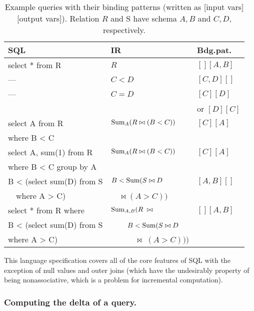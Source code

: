 \begin{table}
\begin{center}
\begin{scriptsize}
\begin{tabular}{|l|l|l|}
\hline
SQL & IR & Bdg.pat. \\
\hline
select * from R   & $R$ & $[][A,B]$ \\
--- & $C < D$ & $[C,D][]$ \\
--- & $C = D$ & $[C][D]$ \\
&& or $[D][C]$
\\[1ex]
select A from R   & $\mbox{Sum}_A(R \bowtie (B < C))$ & $[C][A]$ \\
where B < C       &&
\\[1ex]
select A, sum(1) from R  & $\mbox{Sum}_A(R \bowtie (B < C))$ & $[C][A]$ \\
where B < C group by A &&
\\[1ex]
B < (select sum(D) from S & $B < \mbox{Sum}(S \bowtie D$ & $[A,B][]$ \\
~~where A > C) & ~~$\bowtie (A > C))$ &
\\[1ex]
select * from R where & $\mbox{Sum}_{A,B}(R \; \bowtie$ & $[][A,B]$ \\
B < (select sum(D) from S & ~~~~$B < \mbox{Sum}(S \bowtie D$ & \\
where A > C) & ~~~~~~$\bowtie\; (A > C)))$ & \\
\hline
\end{tabular}
\end{scriptsize}
\end{center}

\vspace{-5mm}

\caption{Example queries with their binding patterns (written as [input vars][output vars]). Relation $R$ and S have schema $A,B$ and $C,D$, respectively.}
\label{tab:ir-examples}
\vspace{-3mm}
\end{table}


\medskip



This language specification covers all of the core features of SQL with the exception of
null values and outer joins (which have the undesirably property of being nonassociative, which is a problem for incremental computation).



\subsubsection{Computing the delta of a query.}

